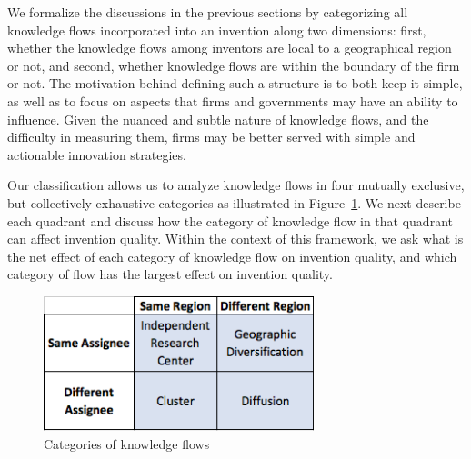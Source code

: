 \documentclass[12pt,letterpaper]{article}
\begin{document}
We formalize the discussions in the previous sections by categorizing all knowledge flows incorporated into an invention along two dimensions:  first, whether the knowledge flows among inventors are local to a geographical region or not, and second, whether knowledge flows are within the boundary of the firm or not. The motivation behind defining such a structure is to both keep it simple, as well as to focus on aspects that firms and governments may have an ability to influence. Given the nuanced and subtle nature of knowledge flows, and the difficulty in measuring them, firms may be better served with simple and actionable innovation strategies. \par

Our classification allows us to analyze knowledge flows in four mutually exclusive, but collectively exhaustive categories as illustrated in Figure~\ref{fig:2x2}. We next describe each quadrant and discuss how the category of knowledge flow in that quadrant can affect invention quality. Within the context of this framework, we ask what is the net effect of each category of knowledge flow on invention quality, and which category of flow has the largest effect on invention quality. \par


\begin{figure}[h!]
\begin{centering}
  \caption{Categories of knowledge flows}
  \label{fig:2x2}
  \includegraphics[width=0.7\textwidth]{2x2}
\end{centering}
\end{figure}
\end{document}

